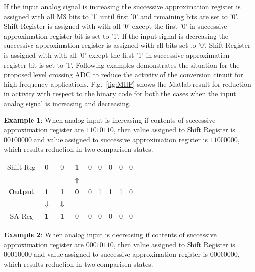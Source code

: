\par
\hspace{0.6cm} If the input analog signal is increasing the successive approximation register is assigned with all MS bits to '1' until first '0' and remaining bits are set to '0'. Shift Register is assigned with with all '0' except the first '0' in successive approximation register bit is set to '1'. If the input signal is decreasing the successive approximation register is assigned with all bits set to '0'. Shift Register is assigned with with all '0' except the first '1' in successive approximation register bit is set to '1'. Following examples demonstrates the situation for the proposed level crossing ADC to reduce the activity of the conversion circuit for high frequency applications. Fig.~\ref{fig:MHF} shows the Matlab result for reduction in activity with respect to the binary code for both the cases when the input analog signal is increasing and decreasing.

\par
\hspace{0.6cm}\textbf{Example 1}: When analog input is increasing if contents of successive approximation register are $11010110$, then value assigned to Shift Register is $00100000$ and value assigned to successive approximation register is $11000000$, which results reduction in two comparison states.

\begin{table}[h]		
	\begin{center}	
		\begin{tabular}{ c  c  c  c  c  c  c  c  c }
					Shift Reg  	& 0 & 0 & \textbf{1} & 0 & 0 & 0 & 0 & 0 \\
				   				&  &  & $\Uparrow$ & & & & & \\		
	 				\textbf{Output}   & \textbf{1} & \textbf{1} & \textbf{0} & 0 & 1 & 1 & 1 & 0 \\
				   				& $\Downarrow$ & $\Downarrow$ & & & & & & \\
					SA Reg     	& \textbf{1} & \textbf{1} & 0 & 0 & 0 & 0 & 0 & 0 \\			
		\end{tabular}
	\end{center}
\end{table}

\par
\hspace{0.6cm}\textbf{Example 2}: When analog input is decreasing if contents of successive approximation register are  $00010110$, then value assigned to Shift Register is $00010000$ and value assigned to successive approximation register is $00000000$, which results reduction in two comparison states.

